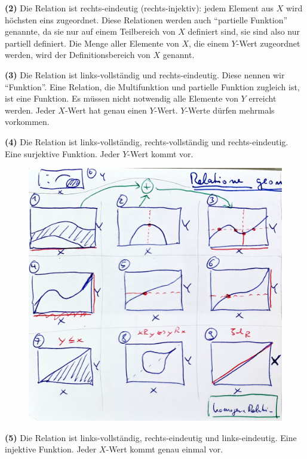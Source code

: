 \documentclass[a4paper]{amsart}
\theoremstyle{definition}
\begin{document}
\textbf{(2)} Die Relation ist rechts-eindeutig (rechts-injektiv): jedem Element aus $X$ wird höchsten eins zugeordnet. Diese Relationen werden auch "`partielle Funktion"' genannte, da sie nur auf einem Teilbereich von $X$ definiert sind, sie sind also nur partiell definiert. Die Menge aller Elemente von $X$, die einem $Y$-Wert zugeordnet werden, wird der Definitionsbereich von $X$ genannt.

\textbf{(3)} Die Relation ist links-vollständig und rechts-eindeutig. Diese nennen wir "`Funktion"'. Eine Relation, die Multifunktion und partielle Funktion zugleich ist, ist eine Funktion. Es müssen nicht notwendig alle Elemente von $Y$ erreicht werden. Jeder $X$-Wert hat genau einen $Y$-Wert. $Y$-Werte dürfen mehrmals vorkommen.

\textbf{(4)} Die Relation ist links-vollständig, rechts-vollständig und rechts-eindeutig. Eine surjektive Funktion. Jeder $Y$-Wert kommt vor.

\begin{figure}
   \centering
   \includegraphics{v3.0.2.0.2 Relationen und Funktionen - Geometrisches Bild Grafik Links.png}
\end{figure}

\textbf{(5)} Die Relation ist links-vollständig, rechts-eindeutig und links-eindeutig. Eine injektive Funktion. Jeder $X$-Wert kommt genau einmal vor.
\end{document}
